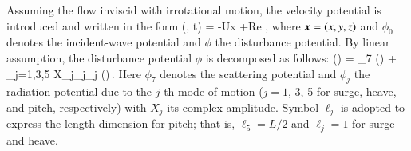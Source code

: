 \documentclass[11pt,fleqn,a3]{article}
\begin{document}
Assuming the flow inviscid with irrotational motion, the velocity potential 
is introduced and written in the form
\be
\gPhi (, t) = -U\hs x 
+{\rm Re}\,\,,    \label{eq001}
\ee
where $\mbox{\boldmath$x$} =(x, y, z)$ and $\phi_0$ denotes the incident-wave potential 
and $\phi$ the disturbance potential.
%
By linear assumption, the disturbance potential $\phi$ is decomposed 
as follows:
\be
\phi () = \ds{} \phi_7 ()
+ \ds\sum_{j=1,3,5} \iomega X_j\hs\ell_j\hs \phi_j ()\,. \label{eq002}
\ee
%
Here $\phi_7$ denotes the scattering potential and $\phi_j$ the 
radiation potential due to the $j$-th mode of motion ($j=1$, 3, 5 for 
surge, heave, and pitch, respectively) with $X_j$ its complex amplitude.
Symbol $\ell_j$ is adopted to express the length dimension for pitch; 
that is, $\ell_5 =L/2$ and $\ell_j=1$ for surge and heave.
\\
\end{document}

